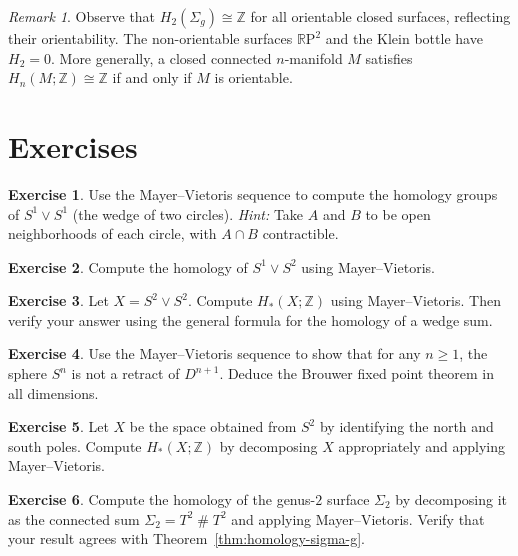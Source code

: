 \documentclass[12pt,a4paper,openany]{book}
\theoremstyle{definition}
\newtheorem{exercise}{Exercise}[chapter]
\theoremstyle{plain}
\theoremstyle{remark}
\newtheorem{remark}[definition]{Remark}
\newcommand{\Z}{\mathbb{Z}}
\newcommand{\RP}{\mathbb{R}\mathrm{P}}
\begin{document}
\begin{remark}
Observe that $H_2(\Sigma_g)\cong\Z$ for all orientable closed surfaces,
reflecting their orientability. The non-orientable surfaces $\RP^2$ and
the Klein bottle have $H_2=0$. More generally, a closed connected
$n$-manifold $M$ satisfies $H_n(M;\Z)\cong\Z$ if and only if $M$ is
orientable.
\end{remark}

\section{Exercises}
\label{sec:mv-exercises}

\begin{exercise}
Use the Mayer--Vietoris sequence to compute the homology groups of
$S^1\vee S^1$ (the wedge of two circles). \textit{Hint:} Take $A$
and $B$ to be open neighborhoods of each circle, with $A\cap B$
contractible.
\end{exercise}

\begin{exercise}
Compute the homology of $S^1\vee S^2$ using Mayer--Vietoris.
\end{exercise}

\begin{exercise}
Let $X = S^2\vee S^2$. Compute $H_*(X;\Z)$ using Mayer--Vietoris.
Then verify your answer using the general formula for the homology of
a wedge sum.
\end{exercise}

\begin{exercise}
Use the Mayer--Vietoris sequence to show that for any $n\geq 1$,
the sphere $S^n$ is not a retract of $D^{n+1}$. Deduce the
Brouwer fixed point theorem in all dimensions.
\end{exercise}

\begin{exercise}
Let $X$ be the space obtained from $S^2$ by identifying the north
and south poles. Compute $H_*(X;\Z)$ by decomposing $X$ appropriately
and applying Mayer--Vietoris.
\end{exercise}

\begin{exercise}
Compute the homology of the genus-$2$ surface $\Sigma_2$ by
decomposing it as the connected sum
$\Sigma_2 = T^2\mathbin{\#} T^2$ and applying Mayer--Vietoris.
Verify that your result agrees with Theorem~\ref{thm:homology-sigma-g}.
\end{exercise}
\end{document}

